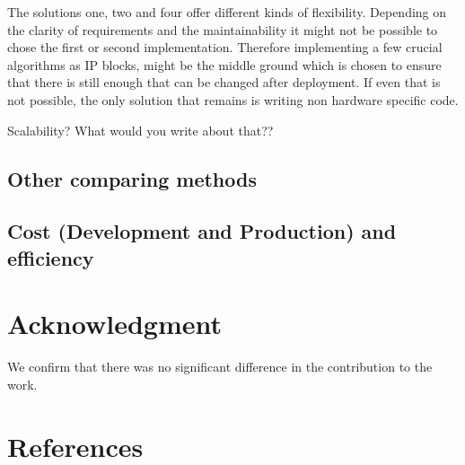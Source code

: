 \documentclass[conference]{IEEEtran}
\begin{document}
The solutions one, two and four offer different kinds of flexibility. Depending on the clarity of requirements and the maintainability it might not be possible to chose the first or second implementation. Therefore implementing a few crucial algorithms as IP blocks, might be the middle ground which is chosen to ensure that there is still enough that can be changed after deployment. If even that is not possible, the only solution that remains is writing non hardware specific code.

Scalability? What would you write about that??

\subsection{Other comparing methods}


\subsection{Cost (Development and Production) and efficiency}



\section*{Acknowledgment}

We confirm that there was no significant difference in the contribution to the work.

\section*{References}

\printbibliography
\end{document}
